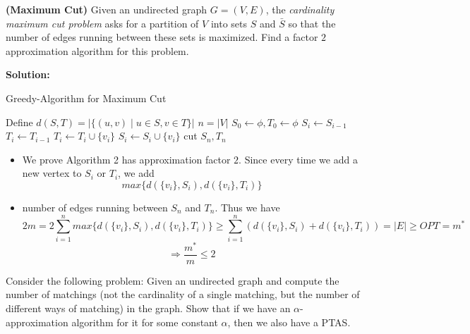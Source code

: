 \documentclass{article}
\newcounter{exercise}
\newcommand{\<}{
    \langle}
\renewcommand{\>}{
    \rangle}
\begin{document}
{\begin{itemize}
\end{itemize}
\newpage




\begin{exercise}
	\textbf{(Maximum Cut)} Given an undirected graph $G=(V,E)$, the \textit{cardinality maximum cut problem} asks for a partition of $V$ into sets $S$ and $\bar{S}$ so that the number of edges running between these sets is maximized. Find a factor $2$ approximation algorithm for this problem.
\end{exercise}

\textbf{Solution:}

\begin{algorithm}[htb]
\caption{Greedy-Algorithm for Maximum Cut}
	\begin{algorithmic}[1]
		\State Define $d(S,T)=|\{(u,v)\mid u\in S, v\in T\}|$
		\State $n=|V|$
		\State $S_0\leftarrow \phi, T_0\leftarrow \phi$
			\State $S_i\leftarrow S_{i-1}$
			\State $T_i\leftarrow T_{i-1}$
			\State $T_i\leftarrow T_i\cup \{v_i\}$
			\Else
			\State $S_i\leftarrow S_i\cup \{v_i\}$
			\EndIf
		\EndFor
		\State
		\Return cut $S_n,T_n$
	\end{algorithmic}
\end{algorithm}

\begin{itemize}
	\item We prove Algorithm 2 has approximation factor $2$. Since every time we add a new vertex to $S_i$ or $T_i$, we add
	$$
	max\{d(\{v_i\},S_i), d(\{v_i\},T_i)\}
	$$
	\item number of edges running between $S_n$ and $T_n$. Thus we have
	$$
	2m=2\sum_{i=1}^{n}{max\{d(\{v_i\},S_i), d(\{v_i\},T_i)\}}\geq \sum_{i=1}^{n}{(d(\{v_i\},S_i)+ d(\{v_i\},T_i))}=|E|\geq OPT=m^*
	$$
	$$
	\Rightarrow \frac{m^*}{m}\leq 2
	$$
\end{itemize}
\newpage




\begin{exercise}
	Consider the following problem: Given an undirected graph and compute the number of matchings (not the cardinality of a single matching, but the number of different ways of matching) in the graph. Show that if we have an $\alpha$-approximation algorithm for it for some constant $\alpha$, then we also have a PTAS.
\end{exercise}

}
\end{document}
